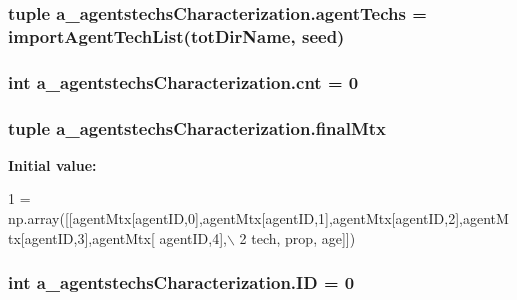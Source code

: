 \hypertarget{namespacea__agentstechs_characterization_ae28225ae1424be19f35602a5ed678424}{
\subsubsection[{agent\-Techs}]{\setlength{\rightskip}{0pt plus 5cm}tuple a\-\_\-agentstechs\-Characterization.\-agent\-Techs = {\bf import\-Agent\-Tech\-List}({\bf tot\-Dir\-Name}, seed)}}\label{namespacea__agentstechs_characterization_ae28225ae1424be19f35602a5ed678424}
\hypertarget{namespacea__agentstechs_characterization_a84e4c9fac6759db4abed8669958b9e79}{
\subsubsection[{cnt}]{\setlength{\rightskip}{0pt plus 5cm}int a\-\_\-agentstechs\-Characterization.\-cnt = 0}}\label{namespacea__agentstechs_characterization_a84e4c9fac6759db4abed8669958b9e79}
\hypertarget{namespacea__agentstechs_characterization_a85384f68fcde2dc6b1b397c7629859fc}{
\subsubsection[{final\-Mtx}]{\setlength{\rightskip}{0pt plus 5cm}tuple a\-\_\-agentstechs\-Characterization.\-final\-Mtx}}\label{namespacea__agentstechs_characterization_a85384f68fcde2dc6b1b397c7629859fc}
{\bfseries Initial value\-:}
\begin{DoxyCode}
1 = np.array([[agentMtx[agentID,0],agentMtx[agentID,1],agentMtx[agentID,2],agentMtx[agentID,3],agentMtx[
      agentID,4],\(\backslash\)
2                                             tech, prop, age]])
\end{DoxyCode}
\hypertarget{namespacea__agentstechs_characterization_a10c3f0b49c4782984d036f57c540b5eb}{
\subsubsection[{I\-D}]{\setlength{\rightskip}{0pt plus 5cm}int a\-\_\-agentstechs\-Characterization.\-I\-D = 0}}\label{namespacea__agentstechs_characterization_a10c3f0b49c4782984d036f57c540b5eb}
